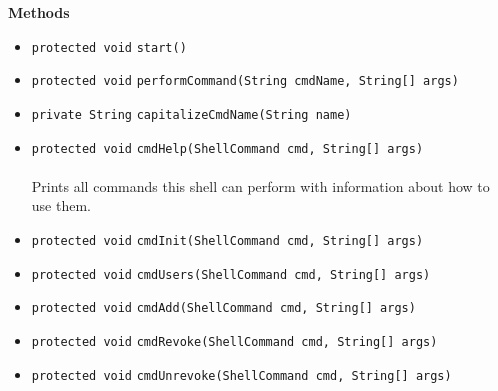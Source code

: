\textbf{\sffamily Methods}
\begin{itemize}
\item \lstinline|protected void| \lstinline|start|\lstinline|()| \\[-0.6em]




\item \lstinline|protected void| \lstinline|performCommand|\lstinline|(String cmdName, String[] args)| \\[-0.6em]




\item \lstinline|private String| \lstinline|capitalizeCmdName|\lstinline|(String name)| \\[-0.6em]




\item \lstinline|protected void| \lstinline|cmdHelp|\lstinline|(ShellCommand cmd, String[] args)|\\ \\[-0.6em]
Prints all commands this shell can perform with information about how to use them.



\item \lstinline|protected void| \lstinline|cmdInit|\lstinline|(ShellCommand cmd, String[] args)| \\[-0.6em]




\item \lstinline|protected void| \lstinline|cmdUsers|\lstinline|(ShellCommand cmd, String[] args)| \\[-0.6em]




\item \lstinline|protected void| \lstinline|cmdAdd|\lstinline|(ShellCommand cmd, String[] args)| \\[-0.6em]




\item \lstinline|protected void| \lstinline|cmdRevoke|\lstinline|(ShellCommand cmd, String[] args)| \\[-0.6em]




\item \lstinline|protected void| \lstinline|cmdUnrevoke|\lstinline|(ShellCommand cmd, String[] args)| \\[-0.6em]





\end{itemize}
